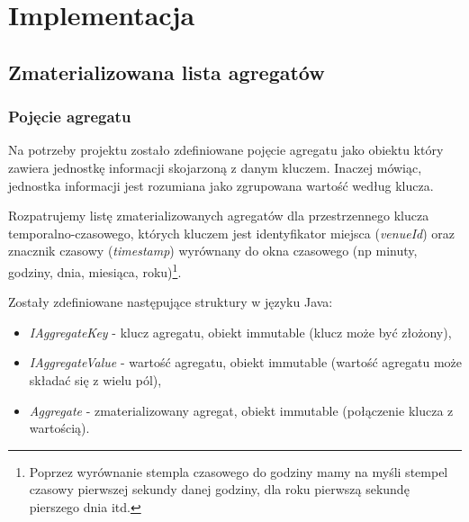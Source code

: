 \section{Implementacja}

\subsection{Zmaterializowana lista agregatów}
\subsubsection{Pojęcie agregatu}
\label{sec:impl-mal-aggregate}

Na potrzeby projektu zostało zdefiniowane pojęcie agregatu\cite{mal-lru-gorawski} jako obiektu który zawiera jednostkę informacji skojarzoną z danym kluczem. Inaczej mówiąc, jednostka informacji jest rozumiana jako zgrupowana wartość według klucza.

Rozpatrujemy listę zmaterializowanych agregatów dla przestrzennego klucza temporalno-czasowego, których kluczem jest identyfikator miejsca (\emph{venueId}) oraz znacznik czasowy (\emph{timestamp}) wyrównany do okna czasowego (np minuty, godziny, dnia, miesiąca, roku)\footnote{Poprzez wyrównanie stempla czasowego do godziny mamy na myśli stempel czasowy pierwszej sekundy danej godziny, dla roku pierwszą sekundę pierszego dnia itd.}.

Zostały zdefiniowane następujące struktury w języku Java:

\begin{itemize}[noitemsep]
  \item \emph{IAggregateKey} - klucz agregatu, obiekt immutable (klucz może być złożony),
  \item \emph{IAggregateValue} - wartość agregatu, obiekt immutable (wartość agregatu może składać się z wielu pól),
  \item \emph{Aggregate} - zmaterializowany agregat, obiekt immutable (połączenie klucza z wartością).
\end{itemize}







